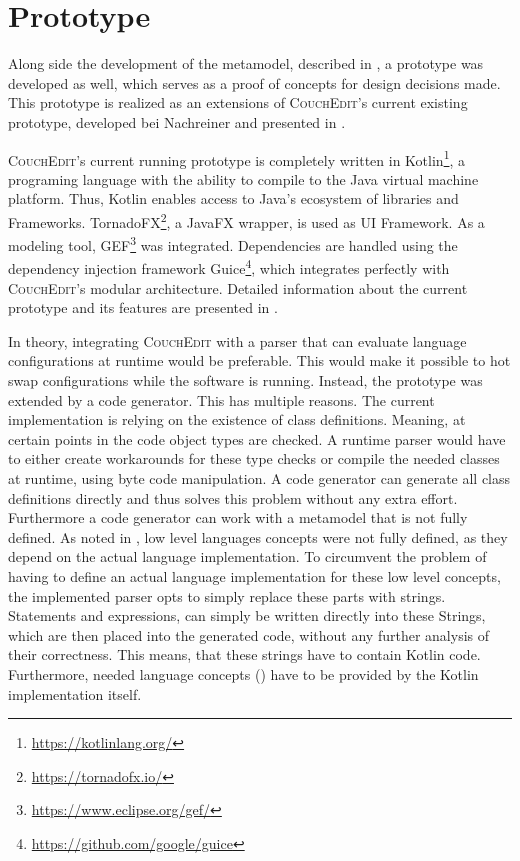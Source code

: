 \chapter{Prototype}
\label{ch:prototype}
Along side the development of the metamodel, described in , a prototype was developed as well, which serves as a proof of concepts for design decisions made. This prototype is realized as an extensions of \textsc{CouchEdit}'s current existing prototype, developed bei Nachreiner and presented in \cite{nachreiner_couchedit_2020}.

\textsc{CouchEdit}'s current running prototype is completely written in Kotlin\footnote{\url{https://kotlinlang.org/}}, a programing language with the ability to compile to the Java virtual machine platform. Thus, Kotlin enables access to Java's ecosystem of libraries and Frameworks. TornadoFX\footnote{\url{https://tornadofx.io/}}, a JavaFX wrapper, is used as UI Framework. As a modeling tool, GEF\footnote{\url{https://www.eclipse.org/gef/}} was integrated. Dependencies are handled using the dependency injection framework Guice\footnote{\url{https://github.com/google/guice}}, which integrates perfectly with \textsc{CouchEdit}'s modular architecture. Detailed information about the current prototype and its features are presented in \cite{nachreiner_couchedit_2020}.

In theory, integrating \textsc{CouchEdit} with a parser that can evaluate language configurations at runtime would be preferable. This would make it possible to hot swap configurations while the software is running. Instead, the prototype was extended by a code generator. This has multiple reasons. The current implementation is relying on the existence of class definitions. Meaning, at certain points in the code object types are checked. A runtime parser would have to either create workarounds for these type checks or compile the needed classes at runtime, using byte code manipulation. A code generator can generate all class definitions directly and thus solves this problem without any extra effort. Furthermore a code generator can work with a metamodel that is not fully defined. As noted in , low level languages concepts were not fully defined, as they depend on the actual language implementation. To circumvent the problem of having to define an actual language implementation for these low level concepts, the implemented parser opts to simply replace these parts with strings. Statements and expressions, can simply be written directly into these Strings, which are then placed into the generated code, without any further analysis of their correctness. This means, that these strings have to contain Kotlin code. Furthermore, needed language concepts () have to be provided by the Kotlin implementation itself.

